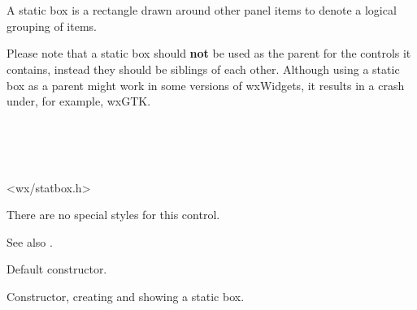 \section{}\label{wxstaticbox}

A static box is a rectangle drawn around other panel items to denote
a logical grouping of items.

Please note that a static box should {\bf not} be used as the parent for the
controls it contains, instead they should be siblings of each other. Although
using a static box as a parent might work in some versions of wxWidgets, it
results in a crash under, for example, wxGTK.


\\
\\
\\


<wx/statbox.h>


There are no special styles for this control.

See also .




\label{wxstaticboxconstr}


Default constructor.


Constructor, creating and showing a static box.




